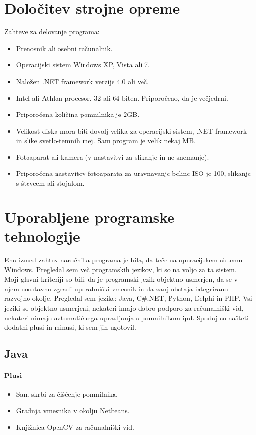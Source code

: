 \documentclass[oneside, a4paper, 12pt]{book}
\begin{document}
\section{Določitev strojne opreme}
Zahteve za delovanje programa:
\begin{itemize}
\item Prenosnik ali osebni računalnik.
\item Operacijski sistem Windows XP, Vista ali 7.
\item Naložen .NET framework verzije 4.0 ali več.
\item Intel ali Athlon procesor. 32 ali 64 biten. Priporočeno, da je večjedrni.
\item Priporočena količina pomnilnika je 2GB.
\item Velikost diska mora biti dovolj velika za operacijski sistem, .NET framework in slike svetlo-temnih mej. Sam program je velik nekaj MB. 
\item Fotoaparat ali kamera (v nastavitvi za slikanje in ne snemanje).
\item Priporočena nastavitev fotoaparata za uravnavanje beline ISO je 100, slikanje s števcem ali stojalom.
\end{itemize}

\section{Uporabljene programske tehnologije}
Ena izmed zahtev naročnika programa je bila, da teče na operacijskem sistemu Windows. Pregledal sem več programskih jezikov, ki so na voljo za ta sistem. Moji glavni kriteriji so bili, da je programski jezik objektno usmerjen, da se v njem enostavno zgradi uporabniški vmesnik in da zanj obstaja integrirano razvojno okolje. Pregledal sem jezike: Java, C\#.NET, Python, Delphi in PHP. Vsi jeziki so objektno usmerjeni, nekateri imajo dobro podporo za računalniški vid, nekateri nimajo avtomatičnega upravljanja s pomnilnikom ipd. Spodaj so našteti dodatni plusi in minusi, ki sem jih ugotovil.

\subsection{Java}
\paragraph{Plusi}
\begin{itemize}
\item Sam skrbi za čiščenje pomnilnika.
\item Gradnja vmesnika v okolju Netbeans.
\item Knjižnica OpenCV za računalniški vid.
\end{itemize}
\end{document}

